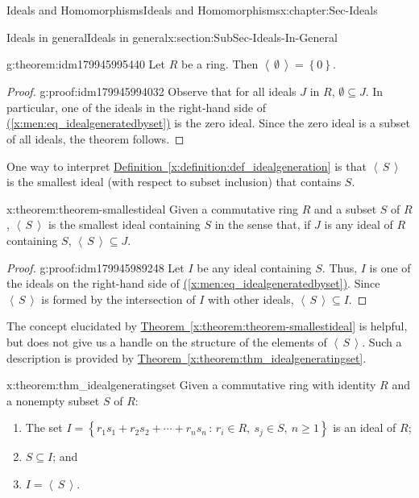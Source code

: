 \documentclass[oneside,10pt,]{book}
\newcommand{\xreffont}{\relax}
\numberwithin{equation}{section}
\renewcommand{\ge}{\geqslant}
\newcommand{\ideal}[1]{\left\langle\, #1 \,\right\rangle}
\newcommand{\set}[1]{\left\{ {#1} \right\}}
\newcommand{\setof}[2]{{\left\{#1\,\colon\,#2\right\}}}
\begin{document}
\begin{chapterptx}{Ideals and Homomorphisms}{}{Ideals and Homomorphisms}{}{}{x:chapter:Sec-Ideals}
\begin{sectionptx}{Ideals in general}{}{Ideals in general}{}{}{x:section:SubSec-Ideals-In-General}
\begin{theorem}{}{}{g:theorem:idm179945995440}%
Let \(R\) be a ring. Then \(\ideal{\emptyset} = \set{0}\).\end{theorem}
\begin{proof}{}{g:proof:idm179945994032}
Observe that for all ideals \(J\) in \(R\), \(\emptyset\subseteq J\). In particular, one of the ideals in the right-hand side of \hyperref[x:men:eq_idealgeneratedbyset]{({\xreffont\ref{x:men:eq_idealgeneratedbyset}})} is the zero ideal. Since the zero ideal is a subset of all ideals, the theorem follows.%
\end{proof}
One way to interpret \hyperref[x:definition:def_idealgeneration]{Definition~{\xreffont\ref{x:definition:def_idealgeneration}}} is that \(\ideal{S}\) is the smallest ideal (with respect to subset inclusion) that contains \(S\).%
\begin{theorem}{}{}{x:theorem:theorem-smallestideal}%
Given a commutative ring \(R\) and a subset \(S\) of \(R\), \(\ideal{S}\) is the smallest ideal containing \(S\) in the sense that, if \(J\) is any ideal of \(R\) containing \(S\), \(\ideal{S}\subseteq J\).%
\end{theorem}
\begin{proof}{}{g:proof:idm179945989248}
Let \(I\) be any ideal containing \(S\). Thus, \(I\) is one of the ideals on the right-hand side of \hyperref[x:men:eq_idealgeneratedbyset]{({\xreffont\ref{x:men:eq_idealgeneratedbyset}})}. Since \(\ideal{S}\) is formed by the intersection of \(I\) with other ideals, \(\ideal{S}\subseteq I\).%
\end{proof}
The concept elucidated by \hyperref[x:theorem:theorem-smallestideal]{Theorem~{\xreffont\ref{x:theorem:theorem-smallestideal}}} is helpful, but does not give us a handle on the structure of the elements of \(\ideal{S}\). Such a description is provided by \hyperref[x:theorem:thm_idealgeneratingset]{Theorem~{\xreffont\ref{x:theorem:thm_idealgeneratingset}}}.%
\begin{theorem}{}{}{x:theorem:thm_idealgeneratingset}%
Given a commutative ring with identity \(R\) and a nonempty subset \(S\) of \(R\):%
\begin{enumerate}
\item{}The set \(I = \setof{r_1 s_1 + r_2 s_2 + \cdots + r_n s_n}{r_i\in R, \ s_j \in S,\ n\ge 1}\) is an ideal of \(R\);%
\item{}\(S\subseteq I\); and%
\item{}\(I = \ideal{S}\).%
\end{enumerate}

\end{theorem}
\end{sectionptx}
\end{chapterptx}
\end{document}
